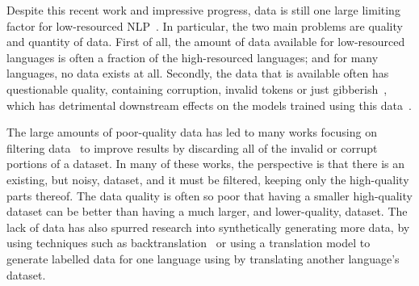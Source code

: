 \documentclass{article}
\begin{document}
Despite this recent work and impressive progress, data is still one large limiting factor for low-resourced NLP~\citep{adelani2022Thousand,adelani2022Masakhaner}. In particular, the two main problems are quality and quantity of data. First of all, the amount of data available for low-resourced languages is often a fraction of the high-resourced languages; and for many languages, no data exists at all. Secondly, the data that is available often has questionable quality, containing corruption, invalid tokens or just gibberish~\citep{kreutzer2021Quality}, which has detrimental downstream effects on the models trained using this data~\citep{abdul2012Extrinsic,alabi2019Massive}.




The large amounts of poor-quality data has led to many works focusing on filtering data~\citep{axelrod2011Domain,xu2019Improving,imankulova2017Improving,abdulmumin-hybrid-2021,abdulmumin2022Separating} to improve results by discarding all of the invalid or corrupt portions of a dataset. In many of these works, the perspective is that there is an existing, but noisy, dataset, and it must be filtered, keeping only the high-quality parts thereof. The data quality is often so poor that having a smaller high-quality dataset can be better than having a much larger, and lower-quality, dataset. The lack of data has also spurred research into synthetically generating more data, by using techniques such as backtranslation~\citep{bojar2011Improving,lambert2011Investigations,sennrich2015Improving} or using a translation model to generate labelled data for one language using by translating another language's dataset.

\end{document}
